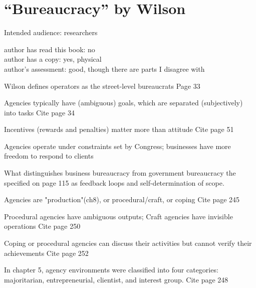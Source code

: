 \section{``Bureaucracy'' by Wilson}

\cite{1991_Wilson}

Intended audience: researchers

author has read this book: no\\
author has a copy: yes, physical\\
author's assessment: good, though there are parts I disagree with


Wilson defines operators as the street-level bureaucrats
Page 33

Agencies typically have (ambiguous) goals, which are separated (subjectively) into tasks
Cite page 34

Incentives (rewards and penalties) matter more than attitude
Cite page 51

Agencies operate under constraints set by Congress; businesses have more freedom to respond to clients

What distinguishes business bureaucracy from government bureaucracy the specified on page 115 as feedback loops and self-determination of scope.

Agencies are "production"(ch8), or procedural/craft, or coping
Cite page 245

Procedural agencies have ambiguous outputs; Craft agencies have invisible operations
Cite page 250

Coping or procedural agencies can discuss their activities but cannot verify their achievements
Cite page 252

In chapter 5, agency environments were classified into four categories: majoritarian, entrepreneurial, clientist, and interest group.
Cite page 248
